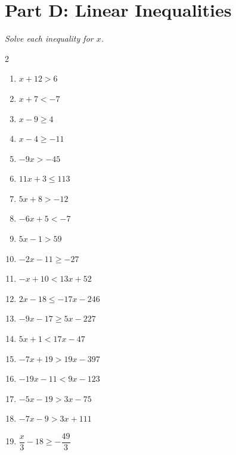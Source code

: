 \documentclass[11pt]{article}
\begin{document}
\section*{Part D: Linear Inequalities}
\noindent\textit{Solve each inequality for $x$.}
\begin{multicols}{2}
\begin{enumerate}
  \item $x + 12 > 6$
  \vspace{1.8cm}
  \item $x + 7 < -7$
  \vspace{1.8cm}
  \item $x - 9 \ge 4$
  \vspace{1.8cm}
  \item $x - 4 \ge -11$
  \vspace{1.8cm}
  \item $-9x > -45$
  \vspace{1.8cm}
  \item $11x + 3 \le 113$
  \vspace{1.8cm}
  \item $5x + 8 > -12$
  \vspace{1.8cm}
  \item $-6x + 5 < -7$
  \vspace{1.8cm}
  \item $5x - 1 > 59$
  \vspace{1.8cm}
  \item $-2x - 11 \ge -27$
  \vspace{1.8cm}
  \item $-x + 10 < 13x + 52$
  \vspace{1.8cm}
  \item $2x - 18 \le -17x - 246$
  \vspace{1.8cm}
  \item $-9x - 17 \ge 5x - 227$
  \vspace{1.8cm}
  \item $5x + 1 < 17x - 47$
  \vspace{1.8cm}
  \item $-7x + 19 > 19x - 397$
  \vspace{1.8cm}
  \item $-19x - 11 < 9x - 123$
  \vspace{1.8cm}
  \item $-5x - 19 > 3x - 75$
  \vspace{1.8cm}
  \item $-7x - 9 > 3x + 111$
  \vspace{1.8cm}
  \item $\dfrac{x}{3} - 18 \ge -\dfrac{49}{3}$

\end{enumerate}
\end{multicols}
\end{document}
